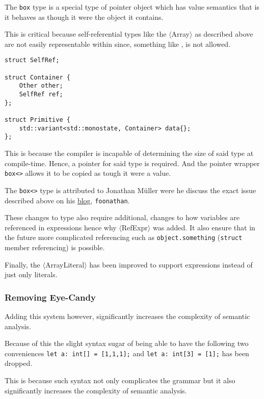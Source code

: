 The \texttt{box} type is a special type of pointer
object which has value semantics that is it behaves
as though it were the object it contains.

This is critical because self-referential types like the
$\langle$Array$\rangle$ as described above are not easily
representable within \CC{} since, something like
, is not allowed.

\begin{lstlisting}[caption={An size unbounded type in \CC{}
(parl/Core.hpp)}, label=lst:unboundedsize]
struct SelfRef;

struct Container {
    Other other;
    SelfRef ref;
};

struct Primitive {
    std::variant<std::monostate, Container> data{};
};
\end{lstlisting}

This is because the \CC{} compiler is incapable of determining
the size of said type at compile-time. Hence, a pointer for said
type is required. And the pointer wrapper \texttt{box<>} allows
it to be copied as tough it were a value.

The \texttt{box<>} type is attributed to Jonathan Müller were he
discuss the exact issue described above on his
\href{https://www.foonathan.net/2022/05/recursive-variant-box/}{
blog}, \texttt{foonathan}.

These changes to type also require additional, changes to how
variables are referenced in expressions hence why
$\langle$RefExpr$\rangle$ was added. It also ensure that in the
future more complicated referencing such as
\texttt{object.something} (\texttt{struct} member referencing)
is possible.

Finally, the $\langle$ArrayLiteral$\rangle$ has been improved to
support expressions instead of just only literals.

\subsubsection{Removing Eye-Candy}\label{eyecandy}

Adding this system however, significantly increases the
complexity of semantic analysis.

Because of this the slight syntax sugar of being able to have
the following two conveniences \texttt{let a: int[] = [1,1,1];}
and \texttt{let a: int[3] = [1];} has been dropped.

This is because such syntax not only complicates the grammar but
it also significantly increases the complexity of semantic
analysis.


